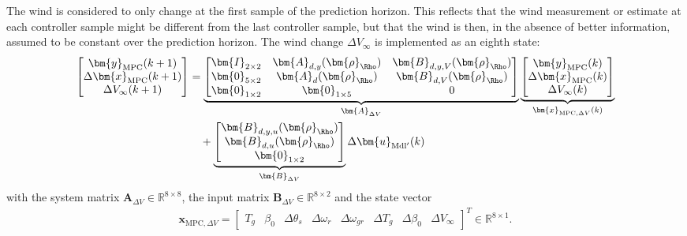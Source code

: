 The wind is considered to only change at the first sample of the prediction horizon. This reflects that the wind measurement or estimate at each controller sample might be different from the last controller sample, but that the wind is then, in the absence of better information, assumed to be constant over the prediction horizon. The wind change $\Delta V_{\infty}$ is implemented as an eighth state:
\begin{equation} \label{eq:AugmentedStateSpace}
    \begin{aligned}
        \begin{bmatrix}
            \bm{y}_{\text{MPC}}(k+1) \\
            \Delta \bm{x}_{\text{MPC}}(k+1) \\
            \Delta V_{\infty}(k+1)
        \end{bmatrix}
        &=
        \underbrace{\begin{bmatrix}
                \bm{I}_{2\times2} & \bm{A}_{d,y}(\bm{\rho}_\Rho) & \bm{B}_{d,y,V}(\bm{\rho}_\Rho) \\
                \bm{0}_{5\times2} & \bm{A}_d(\bm{\rho}_\Rho) & \bm{B}_{d,V}(\bm{\rho}_\Rho) \\
                \bm{0}_{1\times2} & \bm{0}_{1\times5} & 0
        \end{bmatrix}}_{\bm{A}_{\Delta V}}
        \underbrace{\begin{bmatrix}
                \bm{y}_{\text{MPC}}(k) \\
                \Delta \bm{x}_{\text{MPC}}(k) \\
                \Delta V_{\infty}(k)
        \end{bmatrix}}_{\bm{x}_{\text{MPC},\Delta V}(k)} \\
        &\quad +
        \underbrace{
            \begin{bmatrix}
                \bm{B}_{d,y,u}(\bm{\rho}_\Rho) \\
                \bm{B}_{d,u}(\bm{\rho}_\Rho) \\
                \bm{0}_{1\times2}
        \end{bmatrix}}_{\bm{B}_{\Delta V}} \Delta \bm{u}_{\text{Mdl}^\prime}(k)
    \end{aligned}
\end{equation}
with the system matrix $\bm{A}_{\Delta V} \in \mathbb{R}^{8 \times 8}$, the input matrix $\bm{B}_{\Delta V} \in \mathbb{R}^{8 \times 2}$ and the state vector
\begin{align}\label{eq:AugmentedStateVector}
    \bm{x}_{\text{MPC},\Delta V} = \begin{bmatrix} T_g & \beta_0 & \Delta \theta_s & \Delta \omega_r & \Delta \omega_{gr} & \Delta T_g & \Delta \beta_0 & \Delta V_{\infty} \end{bmatrix}^T \in \mathbb{R}^{8 \times 1}.
\end{align}
